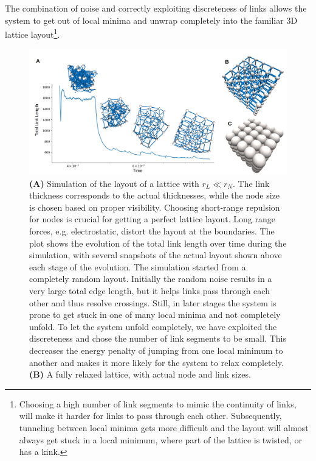 \documentclass[nofootinbib,preprint,floatfix,titlepage,endfloats]{revtex4} %
\begin{document}
The combination of noise and correctly exploiting discreteness of links allows the system to get out of local minima and unwrap completely into the familiar 3D lattice layout\footnote{
Choosing a high number of link segments to mimic the continuity of links, will make it harder for links to pass through each other. 
Subsequently, tunneling between local minima gets more difficult and the layout will almost always get stuck in a local minimum, where part of the lattice is twisted, or has a kink.}.
\begin{figure}
    \centering
    \includegraphics[width=\columnwidth]{fig-09-19/lattice-3.png}
    \caption{\scriptsize {\bf (A)} Simulation of the layout of a lattice with $r_L\ll r_N$. The link thickness corresponds to the actual thicknesses, while the node size is chosen based on proper visibility. Choosing short-range repulsion for nodes is crucial for getting a perfect lattice layout. Long range forces, e.g. electrostatic,  distort the layout at the boundaries. The plot shows the evolution of the total link length over time during the simulation, with several snapshots of the actual layout shown above each stage of the evolution. 
    The simulation started from a completely random layout. 
    Initially the random noise results in a very large total edge length, but it helps links pass through each other and thus resolve crossings.
    Still, in later stages the system is prone to get stuck in one of many local minima and not completely unfold. 
    To let the system unfold completely, we have exploited the discreteness and chose the number of link segments to be small. 
    This decreases the energy penalty of jumping from one local minimum to another and makes it more likely for the system to relax completely. 
    {\bf (B)} A fully relaxed lattice, with actual node and link sizes. 
}
\end{figure}
\end{document}
